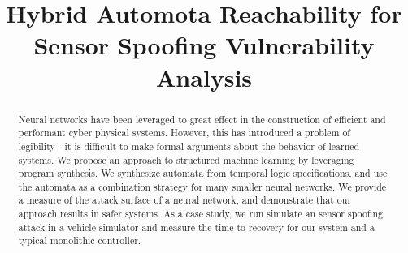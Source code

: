 \documentclass{llncs}
\begin{document}
\setlength{\pdfpageheight}{\paperheight}
\setlength{\pdfpagewidth}{\paperwidth}





\title{Hybrid Automota Reachability for Sensor Spoofing Vulnerability Analysis}

\author{\xspace}
\institute{\xspace}

\maketitle
\begin{abstract}

Neural networks have been leveraged to great effect in the construction of efficient and performant cyber physical systems.
However, this has introduced a problem of legibility - it is difficult to make formal arguments about the behavior of learned systems.
We propose an approach to structured machine learning by leveraging program synthesis.
We synthesize automata from temporal logic specifications, and use the automata as a combination strategy for many smaller neural networks.
We provide a measure of the attack surface of a neural network, and demonstrate that our approach results in safer systems.
As a case study, we run simulate an sensor spoofing attack in a vehicle simulator and measure the time to recovery for our system and a typical monolithic controller.

\end{abstract}

















\end{document}
